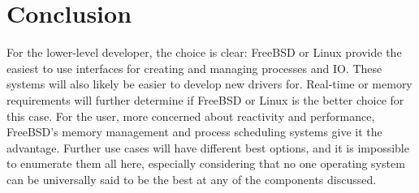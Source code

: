 \documentclass[10pt,draftclsnofoot,onecolumn]{article}
\begin{document}
\section {Conclusion}

For the lower-level developer, the choice is clear: FreeBSD or Linux provide the easiest to use interfaces for creating and managing processes and IO. These systems will also likely be easier to develop new drivers for. Real-time or memory requirements will further determine if FreeBSD or Linux is the better choice for this case. For the user, more concerned about reactivity and performance, FreeBSD’s memory management and process scheduling systems give it the advantage. Further use cases will have different best options, and it is impossible to enumerate them all here, especially considering that no one operating system can be universally said to be the best at any of the components discussed.

\clearpage

\end{document}
